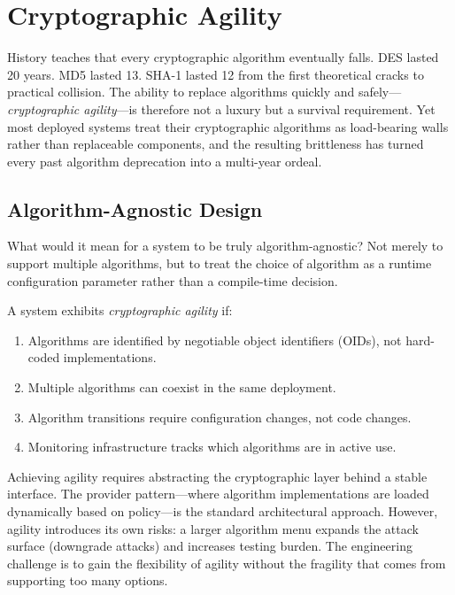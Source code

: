 \section{Cryptographic Agility}
\label{sec:crypto-agility}

History teaches that every cryptographic algorithm eventually falls.  DES lasted 20 years.  MD5 lasted 13.  SHA-1 lasted 12 from the first theoretical cracks to practical collision.  The ability to replace algorithms quickly and safely---\emph{cryptographic agility}---is therefore not a luxury but a survival requirement.  Yet most deployed systems treat their cryptographic algorithms as load-bearing walls rather than replaceable components, and the resulting brittleness has turned every past algorithm deprecation into a multi-year ordeal.

\subsection{Algorithm-Agnostic Design}
\label{subsec:agnostic-design}

What would it mean for a system to be truly algorithm-agnostic?  Not merely to support multiple algorithms, but to treat the choice of algorithm as a runtime configuration parameter rather than a compile-time decision.

\begin{definition}
\label{def:crypto-agility}
A system exhibits \emph{cryptographic agility} if:
\begin{enumerate}
\item Algorithms are identified by negotiable object identifiers (OIDs), not hard-coded implementations.
\item Multiple algorithms can coexist in the same deployment.
\item Algorithm transitions require configuration changes, not code changes.
\item Monitoring infrastructure tracks which algorithms are in active use.
\end{enumerate}
\end{definition}

Achieving agility requires abstracting the cryptographic layer behind a stable interface.  The provider pattern---where algorithm implementations are loaded dynamically based on policy---is the standard architectural approach.  However, agility introduces its own risks: a larger algorithm menu expands the attack surface (downgrade attacks) and increases testing burden.  The engineering challenge is to gain the flexibility of agility without the fragility that comes from supporting too many options.

